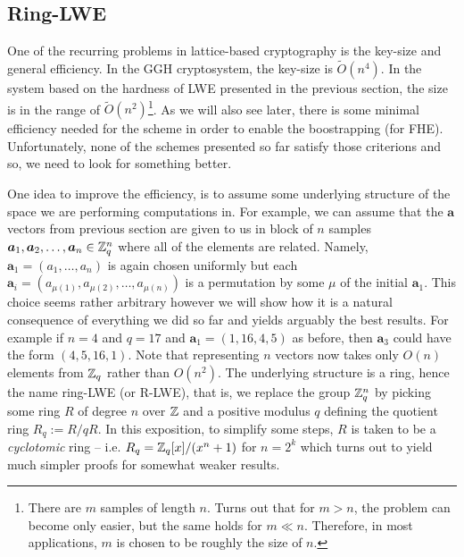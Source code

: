 
\subsection{Ring-LWE}\label{ring-lwe}
One of the recurring problems in lattice-based cryptography is the key-size and general efficiency. In the GGH cryptosystem, the key-size is $\tilde{O}(n^4)$. In the system based on the hardness of LWE presented in the previous section, the size is in the range of $\tilde{O}(n^2)$\footnote{There are $m$ samples of length $n$. Turns out that for $m > n$, the problem can become only easier, but the same holds for $m \ll n$. Therefore, in most applications, $m$ is chosen to be roughly the size of $n$.}. As we will also see later, there is some minimal efficiency needed for the scheme in order to enable the boostrapping (for FHE). Unfortunately, none of the schemes presented so far satisfy those criterions and so, we need to look for something better.

One idea to improve the efficiency, is to assume some underlying structure of the space we are performing computations in. For example, we can assume that the $\bm{a}$ vectors from previous section are given to us in block of $n$ samples $\boldsymbol{a}_1, \boldsymbol{a}_2, \dots, \boldsymbol{a}_n \in \mathbb{Z}_q^n$ where all of the elements are related. Namely, $\bm{a}_1 = (a_1, \dots, a_n)$ is again chosen uniformly but each $\bm{a}_i = (a_{\mu(1)}, a_{\mu(2)}, \ldots, a_{\mu(n)})$ is a permutation by some $\mu$ of the initial $\bm{a}_1$. This choice seems rather arbitrary however we will show how it is a natural consequence of everything we did so far and yields arguably the best results. For example if $n = 4$ and $q = 17$ and $\bm{a}_1 = (1, 16, 4, 5)$ as before, then $\bm{a}_3$ could have the form $(4, 5, 16, 1)$. Note that representing $n$ vectors now takes only $O(n)$ elements from $\mathbb{Z}_q$ rather than $O(n^2)$. The underlying structure is a ring, hence the name ring-LWE (or R-LWE), that is, we replace the group $\mathbb{Z}_q^n$ by picking some ring $R$ of degree $n$ over $\mathbb{Z}$ and a positive modulus $q$ defining the quotient ring $R_q := R/qR$. In this exposition, to simplify some steps, $R$ is taken to be a \textit{cyclotomic} ring -- i.e. $R_q = \mathbb{Z}_q[x]/ (x^n + 1 )$ for $n = 2^k$ which turns out to yield much simpler proofs for somewhat weaker results.

